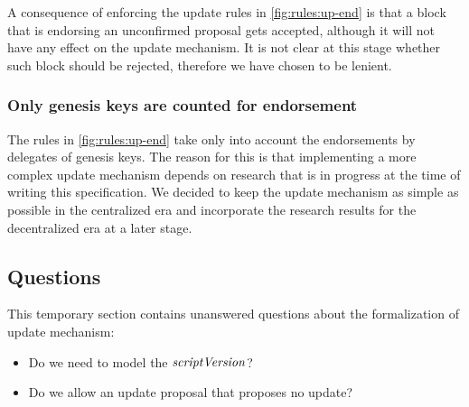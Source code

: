 A consequence of enforcing the update rules in \cref{fig:rules:up-end} is that
a block that is endorsing an unconfirmed proposal gets accepted, although it
will not have any effect on the update mechanism. It is not clear at this stage
whether such block should be rejected, therefore we have chosen to be lenient.

\subsubsection{Only genesis keys are counted for endorsement}
\label{sec:only-genesis-keys-count-for-endorsement}

The rules in \cref{fig:rules:up-end} take only into account the endorsements by
delegates of genesis keys. The reason for this is that implementing a more
complex update mechanism depends on research that is in progress at the time of
writing this specification. We decided to keep the update mechanism as simple
as possible in the centralized era and incorporate the research results for the
decentralized era at a later stage.

\subsection{Questions}
\label{sec:up-questions}

This temporary section contains unanswered questions about the formalization of
update mechanism:

\begin{itemize}
\item Do we need to model the $\mathit{scriptVersion}$?
\item Do we allow an update proposal that proposes no update?
\end{itemize}
